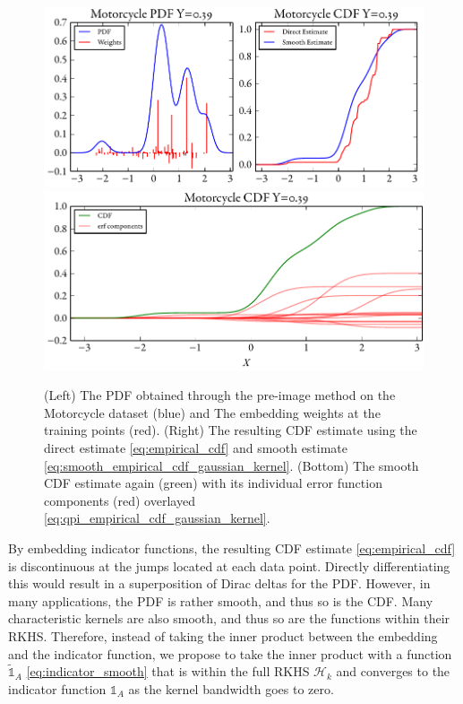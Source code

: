 \documentclass[twoside]{article} \usepackage{aistats2017}
\theoremstyle{definition}
\theoremstyle{theorem}
\begin{document}
		
		\begin{figure}
			\begin{center}
				\includegraphics[width=\columnwidth]{figures/cumulativeexamplesmooth}
				\includegraphics[width=\columnwidth]{figures/cumulativeexampleerf}
			\end{center}
			\caption{\small (Left) The PDF obtained through the pre-image method on the Motorcycle dataset (blue) and The embedding weights at the training points (red). (Right) The resulting CDF estimate using the direct estimate \eqref{eq:empirical_cdf} and smooth estimate \eqref{eq:smooth_empirical_cdf_gaussian_kernel}. (Bottom) The smooth CDF estimate again (green) with its individual error function components (red) overlayed \eqref{eq:qpi_empirical_cdf_gaussian_kernel}.}
			\label{fig:direct_quantile_regression}
		\end{figure}
		
		By embedding indicator functions, the resulting CDF estimate \eqref{eq:empirical_cdf} is discontinuous at the jumps located at each data point. Directly differentiating this would result in a superposition of Dirac deltas for the PDF. However, in many applications, the PDF is rather smooth, and thus so is the CDF. Many characteristic kernels are also smooth, and thus so are the functions within their RKHS. Therefore, instead of taking the inner product between the embedding and the indicator function, we propose to take the inner product with a function $\tilde{\mathbb{1}}_{A}$ \eqref{eq:indicator_smooth} that is within the full RKHS $\mathcal{H}_{k}$ and converges to the indicator function $\mathbb{1}_{A}$ as the kernel bandwidth goes to zero.
		
\end{document}
